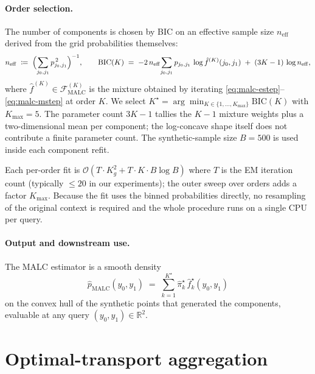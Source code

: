 \documentclass[11pt]{article}
\begin{document}
\paragraph{Order selection.}
The number of components is chosen by BIC on an effective sample size
$n_{\mathrm{eff}}$ derived from the grid probabilities themselves:
\begin{equation}
  n_{\mathrm{eff}}
  \;\coloneqq\;
  \Bigl(\sum_{j_{0}, j_{1}} p_{j_{0}, j_{1}}^{\, 2}\Bigr)^{-1},
  \qquad
  \mathrm{BIC}(K)
  \;=\;
  -2\, n_{\mathrm{eff}}\!
  \sum_{j_{0}, j_{1}} p_{j_{0}, j_{1}}\, \log \hat{f}^{(K)}(j_{0}, j_{1})
  \;+\;
  (3K - 1)\, \log n_{\mathrm{eff}},
  \label{eq:bic}
\end{equation}
where $\hat{f}^{(K)} \in \mathcal{F}_{\mathrm{MALC}}^{(K)}$ is the
mixture obtained by iterating
\eqref{eq:malc-estep}--\eqref{eq:malc-mstep} at order $K$. We select
$K^{\star} = \arg\min_{K \in \{1, \dots, K_{\max}\}} \mathrm{BIC}(K)$
with $K_{\max} = 5$. The parameter count $3K - 1$ tallies the $K - 1$
mixture weights plus a two-dimensional mean per component; the
log-concave shape itself does not contribute a finite parameter count.
The synthetic-sample size $B = 500$ is used inside each component
refit.

Each per-order fit is $\mathcal{O}(T \cdot K_{g}^{2} + T \cdot K \cdot
B \log B)$ where $T$ is the EM iteration count (typically $\leq 20$
in our experiments); the outer sweep over orders adds a factor
$K_{\max}$. Because the fit uses the binned probabilities directly, no
resampling of the original context is required and the whole
procedure runs on a single CPU per query.

\paragraph{Output and downstream use.}
The MALC estimator is a smooth density
\begin{equation}
  \hat{p}_{\mathrm{MALC}}(y_{0}, y_{1})
  \;=\;
  \sum_{k=1}^{K^{\star}} \hat{\pi}_{k}^{\star}\,
  \hat{f}_{k}^{\star}(y_{0}, y_{1})
  \label{eq:malc-output}
\end{equation}
on the convex hull of the synthetic points that generated the
components, evaluable at any query $(y_{0}, y_{1}) \in \mathbb{R}^{2}$.

\section{Optimal-transport aggregation}
\label{app:ot}
\end{document}
